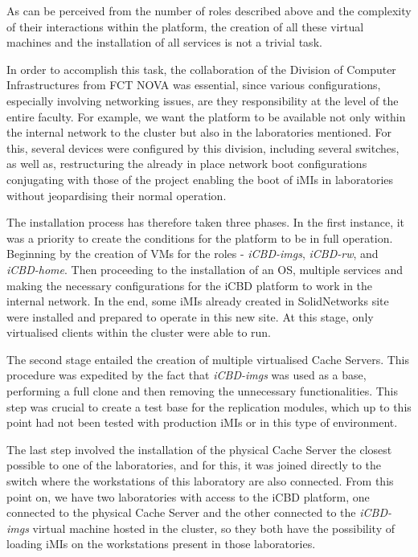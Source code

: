 As can be perceived from the number of roles described above and the complexity of their interactions within the platform, the creation of all these virtual machines and the installation of all services is not a trivial task. 

In order to accomplish this task, the collaboration of the Division of Computer Infrastructures from FCT NOVA was essential, since various configurations, especially involving networking issues, are they responsibility at the level of the entire faculty. For example, we want the platform to be available not only within the internal network to the cluster but also in the laboratories mentioned. For this, several devices were configured by this division, including several switches, as well as, restructuring the already in place network boot configurations conjugating with those of the project enabling the boot of iMIs in laboratories without jeopardising their normal operation.

The installation process has therefore taken three phases. In the first instance, it was a priority to create the conditions for the platform to be in full operation. Beginning by the creation of VMs for the  roles - \textit{iCBD-imgs}, \textit{iCBD-rw}, and \textit{iCBD-home}. Then proceeding to the installation of an OS, multiple services and making the necessary configurations for the iCBD platform to work in the internal network. In the end, some iMIs already created in SolidNetworks site were installed and prepared to operate in this new site. At this stage, only virtualised clients within the cluster were able to run.

The second stage entailed the creation of multiple virtualised Cache Servers. This procedure was expedited by the fact that \textit{iCBD-imgs} was used as a base, performing a full clone and then removing the unnecessary functionalities. This step was crucial to create a test base for the replication modules, which up to this point had not been tested with production iMIs or in this type of environment.

The last step involved the installation of the physical Cache Server the closest possible to one of the laboratories, and for this, it was joined directly to the switch where the workstations of this laboratory are also connected. From this point on, we have two laboratories with access to the iCBD platform, one connected to the physical Cache Server and the other connected to the \textit{iCBD-imgs} virtual machine hosted in the cluster, so they both have the possibility of loading iMIs on the workstations present in those laboratories.


